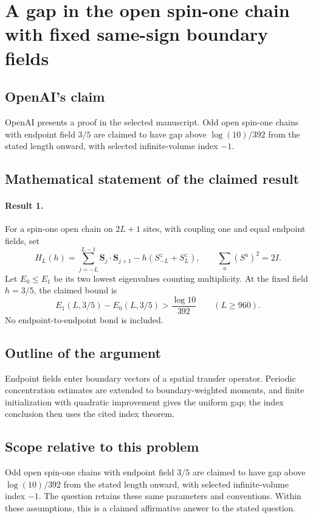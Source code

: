 \documentclass[11pt]{article}
\begin{document}
\section*{A gap in the open spin-one chain with fixed same-sign boundary fields}

\subsection{OpenAI's claim}
OpenAI presents a proof in the selected manuscript. Odd open spin-one chains with endpoint field $3/5$ are claimed to have gap above $\log(10)/392$ from the stated length onward, with selected infinite-volume index $-1$.

\subsection{Mathematical statement of the claimed result}
\paragraph{Result 1.} For a spin-one open chain on \(2L+1\) sites, with coupling one and equal endpoint fields, set
\[
 H_L(h)=\sum_{j=-L}^{L-1}\boldsymbol S_j\cdot\boldsymbol S_{j+1}
 -h(S_{-L}^z+S_L^z),\qquad\sum_a(S^a)^2=2I.
\]
Let \(E_0\le E_1\) be its two lowest eigenvalues counting multiplicity. At the fixed field \(h=3/5\), the claimed bound is
\[
 E_1(L,3/5)-E_0(L,3/5)>\frac{\log10}{392}\qquad(L\ge960).
\]
No endpoint-to-endpoint bond is included.

\subsection{Outline of the argument}
Endpoint fields enter boundary vectors of a spatial transfer operator. Periodic concentration estimates are extended to boundary-weighted moments, and finite initialization with quadratic improvement gives the uniform gap; the index conclusion then uses the cited index theorem.

\subsection{Scope relative to this problem}
Odd open spin-one chains with endpoint field $3/5$ are claimed to have gap above $\log(10)/392$ from the stated length onward, with selected infinite-volume index $-1$. The question retains these same parameters and conventions. Within these assumptions, this is a claimed affirmative answer to the stated question.
\end{document}
